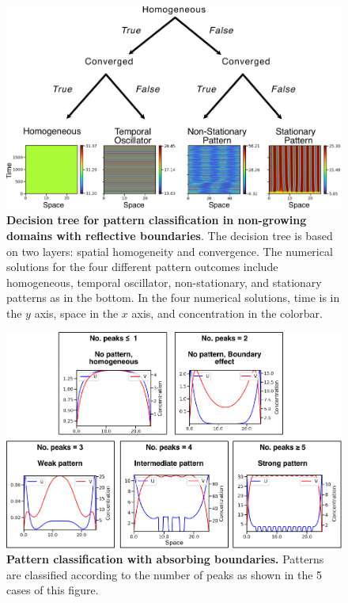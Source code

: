 \documentclass[10pt,letterpaper]{article}
\begin{document}
\begin{figure}[H]
    \includegraphics[width=1\textwidth]{figures/no_growth_classification}
    \vspace{5pt}
    \caption{{\bf Decision tree for pattern classification in non-growing domains with reflective boundaries}. The decision tree is based on two layers: spatial homogeneity and convergence. The numerical solutions for the four different pattern outcomes include homogeneous, temporal oscillator, non-stationary, and stationary patterns as in the bottom. In the four numerical solutions, time is in the $y$ axis, space in the $x$ axis, and concentration in the colorbar.}
    \label{sup_fig2}
\end{figure}


\begin{figure}[H]
    \includegraphics[width=1\textwidth]{figures/growth_classification}
    \vspace{5pt}

    \caption{{\bf Pattern classification with absorbing boundaries.} Patterns are classified according to the number of peaks as shown in the 5 cases of this figure.}
    \label{sup_fig3}
\end{figure}
\end{document}
